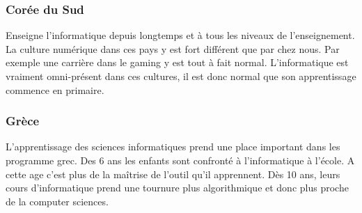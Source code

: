 \subsubsection{Corée du Sud}
Enseigne l'informatique depuis longtemps et à tous les niveaux de l'enseignement. La culture numérique dans ces pays y est fort différent que par chez nous. Par exemple une carrière dans le gaming y est tout à fait normal. L'informatique est vraiment omni-présent dans ces cultures, il est donc normal que son apprentissage commence en primaire.

\subsubsection{Grèce}
L'apprentissage des sciences informatiques prend une place important dans les programme grec. Des 6 ans les enfants sont confronté à l'informatique à l'école. A cette age c'est plus de la maîtrise de l'outil qu'il apprennent. Dès 10 ans, leurs cours d'informatique prend une tournure plus algorithmique et donc plus proche de la computer sciences.
